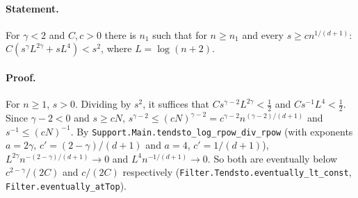 \paragraph{Statement.} For $\gamma<2$ and $C,c>0$ there is $n_1$ such that for $n\ge n_1$ and every
$s\ge cn^{1/(d+1)}$: $C(s^\gamma L^{2\gamma}+sL^4)<s^2$, where $L=\log(n+2)$.
\paragraph{Proof.} For $n\ge1$, $s>0$. Dividing by $s^2$, it suffices that
$Cs^{\gamma-2}L^{2\gamma}<\frac12$ and $Cs^{-1}L^4<\frac12$. Since $\gamma-2<0$ and $s\ge cN$,
$s^{\gamma-2}\le(cN)^{\gamma-2}=c^{\gamma-2}n^{(\gamma-2)/(d+1)}$ and $s^{-1}\le(cN)^{-1}$. By
\texttt{Support.Main.tendsto\_log\_rpow\_div\_rpow} (with exponents $a=2\gamma$,
$c'=(2-\gamma)/(d+1)$ and $a=4$, $c'=1/(d+1)$), $L^{2\gamma}n^{-(2-\gamma)/(d+1)}\to0$ and
$L^4n^{-1/(d+1)}\to0$. So both are eventually below $c^{2-\gamma}/(2C)$ and $c/(2C)$
respectively (\texttt{Filter.Tendsto.eventually\_lt\_const}, \texttt{Filter.eventually\_atTop}).
